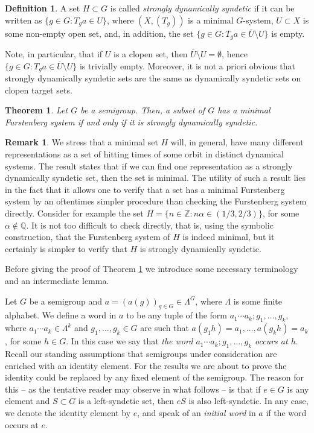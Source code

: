 \documentclass{amsart}
\numberwithin{equation}{section}
\newtheorem{theorem}[lemma]{Theorem}
\theoremstyle{definition}
\newtheorem{definition}[lemma]{Definition}
\newtheorem{remark}[lemma]{Remark}
\theoremstyle{plain}
\newcommand{\Q}{{\mathbb Q}}
\newcommand{\Z}{{\mathbb Z}}
\begin{document}
\begin{definition}\label{strongly dynamically syndetic sets}
A set $H\subset G$ is called \textit{strongly dynamically syndetic} if it can be written as $\{g\in G: T_ga\in U\}$, where $(X,(T_g))$ is a minimal $G$-system, $U\subset X$ is some non-empty open set, and, in addition, the set $\{g\in G: T_ga\in \overline{U}\setminus U\}$ is empty.     
\end{definition}

Note, in particular, that if $U$ is a clopen set, then $\overline{U}\setminus U=\emptyset$, hence $\{g\in G: T_ga\in \overline{U}\setminus U\}$ is trivially empty. 
Moreover, it is not a priori obvious that strongly dynamically syndetic sets are the same as dynamically syndetic sets on clopen target sets. 

\begin{theorem} \label{characterizing minimal sets}
Let $G$ be a semigroup. Then, a subset of $G$ has a minimal 
Furstenberg system if and only if it is strongly dynamically syndetic.
\end{theorem}

\begin{remark}\label{minimal set theorem discussion}
We stress that a minimal set $H$ will, in general, have 
many different representations as a set of hitting 
times of some orbit in distinct dynamical systems. The 
result states that if we can find one representation as 
a strongly dynamically syndetic set, then the set is 
minimal. The utility of such a result lies in the fact 
that it allows one to verify that a set has a minimal 
Furstenberg system by an oftentimes simpler procedure 
than checking the Furstenberg system directly. Consider
for example the set 
$H=\{n\in \Z: n\alpha \in (1/3,2/3)\}$, for some 
$\alpha\notin \Q$. It is not too difficult to check 
directly, that is, using the symbolic construction, 
that the Furstenberg system of $H$ is 
indeed minimal, but it certainly is simpler to verify 
that $H$ is strongly dynamically syndetic. 
\end{remark}

Before giving the proof of Theorem \ref{characterizing minimal sets} we introduce some necessary 
terminology and an intermediate lemma.

Let $G$ be a semigroup and $a=(a(g))_{g\in G}\in \Lambda^G$, where $\Lambda$ 
is some finite alphabet. We define a word in
$a$ to be any tuple of the form $a_1\cdots a_k;g_1,\dots,g_k$, where  
$a_1\cdots a_k\in \Lambda^k$ and $g_1,\dots,g_k\in G$ are such that 
$a(g_1h)=a_1,\dots,a(g_kh)=a_k$, for some $h\in G$. In this case we say that \textit{the word $a_1\cdots a_k;g_1,\dots,g_k$ occurs at $h$}. Recall our standing assumptions that semigroups under consideration are enriched with an identity element. For the results we are about to prove the identity could be replaced by any fixed element of the semigroup. The reason for this -- as the tentative reader may observe in what follows -- is that if $e\in G$ is any element and $S\subset G$ is a left-syndetic set, then $eS$ is also left-syndetic. In any case, we denote the identity element by $e$, and speak of an \textit{initial word} in $a$ if the word occurs at $e$.
\end{document}
